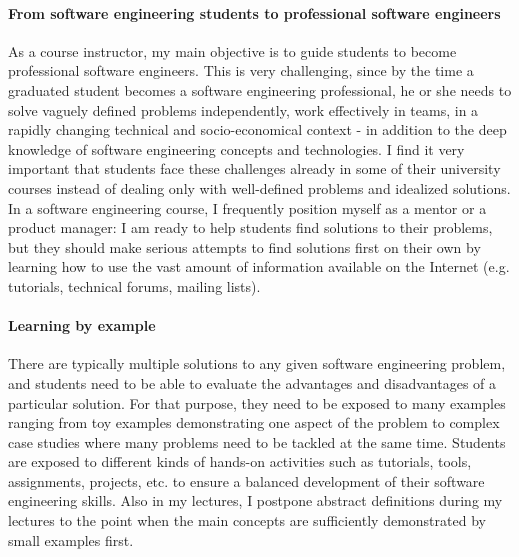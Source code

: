 \paragraph{From software engineering students to professional software engineers}
As a course instructor, my main objective is to guide students to become professional software engineers. This is very 
challenging, since by the time a graduated student becomes a software engineering professional, he or she needs to solve 
vaguely defined problems independently, work effectively in teams, in a rapidly changing technical and socio-economical 
context - in addition to the deep knowledge of software engineering concepts and technologies. I find it very important that 
students face these challenges already in some of their university courses instead of dealing only with well-defined 
problems and idealized solutions. In a software engineering course, I frequently position myself as a mentor or a product 
manager: I am ready to help students find solutions to their problems, but they should make serious attempts to find 
solutions first on their own by learning how to use the vast amount of information available on the Internet (e.g. tutorials, 
technical forums, mailing lists). 

\paragraph{Learning by example}
There are typically multiple solutions to any given software engineering problem, and students need to be able to evaluate 
the advantages and disadvantages of a particular solution. For that purpose, they need to be exposed to many examples 
ranging from toy examples demonstrating one aspect of the problem to complex case studies where many problems need to 
be tackled at the same time. Students are exposed to different kinds of hands-on activities such as tutorials, tools, 
assignments, projects, etc. to ensure a balanced development of their software engineering skills. Also in my lectures, I 
postpone abstract definitions during my lectures to the point when the main concepts are sufficiently demonstrated by small 
examples first.


